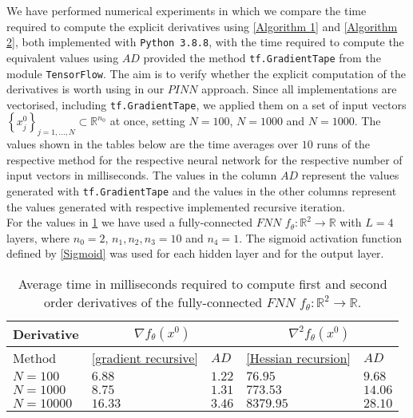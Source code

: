 We have performed numerical experiments in which we compare the time required to compute the explicit derivatives using \cref{Algorithm 1} and \cref{Algorithm 2}, both implemented with \lstinline!Python 3.8.8!, with the time required to compute the equivalent values using $AD$ provided the method \lstinline!tf.GradientTape! from the module \lstinline!TensorFlow!. The aim is to verify whether the explicit computation of the derivatives is worth using in our $PINN$ approach. Since all implementations are vectorised, including \lstinline!tf.GradientTape!, we applied them on a set of input vectors $\left\{ x^0_j \right\}_{j=1,\ldots,N} \subset \mathbb{R}^{n_0}$ at once, setting $N=100$, $N=1000$ and $N=1000$. The values shown in the tables below are the time averages over $10$ runs of the respective method for the respective neural network for the respective number of input vectors in milliseconds. The values in the column $AD$ represent the values generated with \lstinline!tf.GradientTape! and the values in the other columns represent the values generated with respective implemented recursive iteration. \\   
For the values in \cref{tab:advs ecplicit: fnn} we have used a fully-connected $FNN$ $f_{\theta} \colon \mathbb{R}^2 \to \mathbb{R}$ with $L = 4$ layers, where $n_0 = 2$, $n_1, n_2, n_3 = 10$ and $n_4 = 1$. The sigmoid activation function defined by \cref{Sigmoid} was used for each hidden layer and for the output layer. 
\begin{table}[H]
    \resizebox{\textwidth}{!}
    {
        \begin{tabular}{l l l l l }
            \toprule
            Derivative & \multicolumn{2}{c}{$\nabla f_{\theta} \left( x^0 \right)$}& \multicolumn{2}{c}{$\nabla^2 f_{\theta} \left(x^0\right)$} \\ 
            \midrule
            Method & \cref{gradient recursive} & $AD$ & \cref{Hessian recursion} & $AD$ \\ 
            \midrule
            $N = 100$ & $6.88$ & $1.22$ & $76.95$ & $9.68$ \\ 
            \midrule
            $N = 1000$ & $8.75$ & $1.31$ & $773.53$ & $14.06$ \\ 
            \midrule
            $N = 10000$ & $16.33$ & $3.46$ & $8379.95$ & $28.10$ \\ 
            \bottomrule
        \end{tabular}
    }
    \caption{Average time in milliseconds required to compute first and second order derivatives of the fully-connected $FNN$ $f_{\theta} \colon \mathbb{R}^2 \to \mathbb{R}$.}
    \label{tab:advs ecplicit: fnn}
\end{table}
